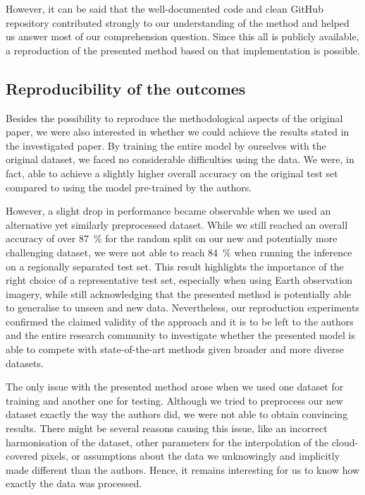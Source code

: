 However, it can be said that the well-documented code and clean GitHub repository contributed strongly to our understanding of the method and helped us answer most of our comprehension question.
Since this all is publicly available, a reproduction of the presented method based on that implementation is possible.


\subsection{Reproducibility of the outcomes}

Besides the possibility to reproduce the methodological aspects of the original paper, we were also interested in whether we could achieve the results stated in the investigated paper.
By training the entire model by ourselves with the original dataset, we faced no considerable difficulties using the data.
We were, in fact, able to achieve a slightly higher overall accuracy on the original test set compared to using the model pre-trained by the authors.

However, a slight drop in performance became observable when we used an alternative yet similarly preprocessed dataset.
While we still reached an overall accuracy of over \SI{87}{\percent} for the random split on our new and potentially more challenging dataset, we were not able to reach \SI{84}{\percent} when running the inference on a regionally separated test set.
This result highlights the importance of the right choice of a representative test set, especially when using Earth observation imagery, while still acknowledging that the presented method is potentially able to generalise to unseen and new data.
Nevertheless, our reproduction experiments confirmed the claimed validity of the approach and it is to be left to the authors and the entire research community to investigate whether the presented model is able to compete with state-of-the-art methods given broader and more diverse datasets.

The only issue with the presented method arose when we used one dataset for training and another one for testing.
Although we tried to preprocess our new dataset exactly the way the authors did, we were not able to obtain convincing results.
There might be several reasons causing this issue, like an incorrect harmonisation of the dataset, other parameters for the interpolation of the cloud-covered pixels, or assumptions about the data we unknowingly and implicitly made different than the authors.
Hence, it remains interesting for us to know how exactly the data was processed.

